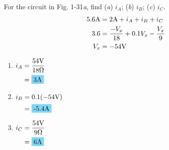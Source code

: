 For the circuit in Fig. 1-31\emph{a}, find (\emph{a}) $i_A$; (\emph{b}) $i_B$; (\emph{c}) $i_C$. \\

\begin{align*}
	5.6\qw{\A} &= 2\qw{\A}+i_A+i_B+i_C \\
	3.6 &= \frac{-V_x}{18}+0.1V_x-\frac{V_x}{9} \\
	V_x &= -54\qw{\V}
\end{align*}

\begin{enumerate}[leftmargin=2cm,labelsep=.5cm,label=\bfseries\alph*)]
	\item $
	\begin{aligned}[t]
	i_A &= \frac{54\qw{\V}}{18\qw{\ohm}} \\
	&= \hlbox{3\qw{\A}}
	\end{aligned} $
	\\[1cm]
	
	\item $
	\begin{aligned}[t]
	i_B &= 0.1(-54\qw{\V}) \\
	&= \hlbox{-5.4\qw{\A}}
	\end{aligned} $
	\\[1cm]
	
	\item $
	\begin{aligned}[t]
	i_C &= \frac{54\qw{\V}}{9\qw{\ohm}} \\
	&= \hlbox{6\qw{\A}}
	\end{aligned} $
	\\[1cm]
\end{enumerate}